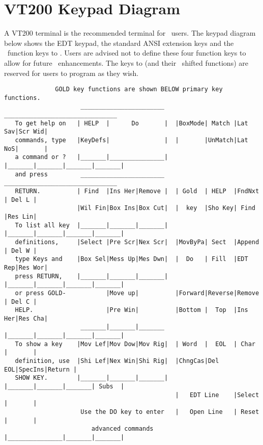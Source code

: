 \newpage

\section{VT200 Keypad Diagram}

A VT200 terminal is the recommended terminal for \STEve\ users. The keypad
diagram below shows the EDT keypad, the standard ANSI extension keys and the
\STEve\ function keys  to  . Users are advised not to
define these four function keys to allow for future \STEve\ enhancements. The
keys  to  (and their \gold\ shifted functions) are
reserved for users to program as they wish.


\begin{small}
\begin{verbatim}
              GOLD key functions are shown BELOW primary key functions.
                     _______________________    _______________________________
   To get help on   | HELP  |      Do       |  |BoxMode| Match |Lat Sav|Scr Wid|
   commands, type   |KeyDefs|               |  |       |UnMatch|Lat NoS|       |
   a command or ?   |_______|_______________|  |_______|_______|_______|_______|
   and press         _______________________    _______________________________
   RETURN.          | Find  |Ins Her|Remove |  | Gold  | HELP  |FndNxt | Del L |
                    |Wil Fin|Box Ins|Box Cut|  |  key  |Sho Key| Find  |Res Lin|
   To list all key  |_______|_______|_______|  |_______|_______|_______|_______|
   definitions,     |Select |Pre Scr|Nex Scr|  |MovByPa| Sect  |Append | Del W |
   type Keys and    |Box Sel|Mess Up|Mes Dwn|  |  Do   | Fill  |EDT Rep|Res Wor|
   press RETURN,    |_______|_______|_______|  |_______|_______|_______|_______|
   or press GOLD-           |Move up|          |Forward|Reverse|Remove | Del C |
   HELP.                    |Pre Win|          |Bottom |  Top  |Ins Her|Res Cha|
                     _______|_______|_______   |_______|_______|_______|_______|
   To show a key    |Mov Lef|Mov Dow|Mov Rig|  | Word  |  EOL  | Char  |       |
   definition, use  |Shi Lef|Nex Win|Shi Rig|  |ChngCas|Del EOL|SpecIns|Return |
   SHOW KEY.        |_______|_______|_______|  |_______|_______|_______| Subs  |
                                               |   EDT Line    |Select |       |
                     Use the DO key to enter   |   Open Line   | Reset |       |
                        advanced commands      |_______________|_______|_______|
\end{verbatim}
\end{small}

